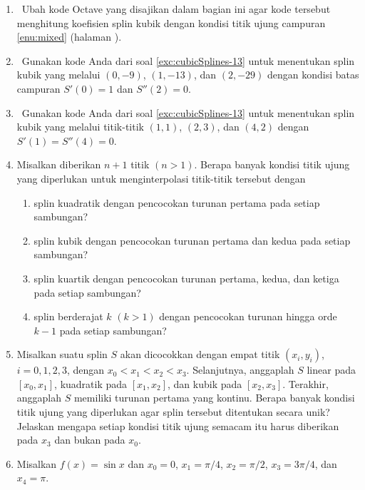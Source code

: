 \begin{enumerate}
\begin{enumerate}
\item \ref{exc:cubicSplines-10}
\item \label{exc:cubicSplines-16}\ref{exc:cubicSplines-11} \hasasolution 
\item \label{exc:cubicSplines-17}\ref{exc:cubicSplines-12} \hasananswer 
\end{enumerate}
\item \octave\ \label{exc:cubicSplines-13}Ubah kode Octave yang disajikan
dalam bagian ini agar kode tersebut menghitung koefisien splin kubik
dengan kondisi titik ujung campuran \ref{enu:mixed} (halaman \pageref{enu:mixed}).
\item \octave\ Gunakan kode Anda dari soal \ref{exc:cubicSplines-13} untuk
menentukan splin kubik yang melalui $(0,-9)$, $(1,-13)$, dan $(2,-29)$
dengan kondisi batas campuran $S'(0)=1$ dan $S''(2)=0$.
\item \octave\ Gunakan kode Anda dari soal \ref{exc:cubicSplines-13} untuk
menentukan splin kubik yang melalui titik-titik $(1,1)$, $(2,3)$,
dan $(4,2)$ dengan $S'(1)=S''(4)=0$.
\item Misalkan diberikan $n+1$ titik $(n>1)$. Berapa banyak kondisi titik
ujung yang diperlukan untuk menginterpolasi titik-titik tersebut dengan

\begin{enumerate}
\item splin kuadratik dengan pencocokan turunan pertama pada setiap sambungan?
\item splin kubik dengan pencocokan turunan pertama dan kedua pada setiap
sambungan?
\item splin kuartik dengan pencocokan turunan pertama, kedua, dan ketiga
pada setiap sambungan?
\item splin berderajat $k$ $(k>1)$ dengan pencocokan turunan hingga orde
$k-1$ pada setiap sambungan?
\end{enumerate}
\item Misalkan suatu splin $S$ akan dicocokkan dengan empat titik $(x_{i},y_{i})$,
$i=0,1,2,3$, dengan $x_{0}<x_{1}<x_{2}<x_{3}$. Selanjutnya, anggaplah
$S$ linear pada $[x_{0},x_{1}]$, kuadratik pada $[x_{1},x_{2}]$,
dan kubik pada $[x_{2},x_{3}]$. Terakhir, anggaplah $S$ memiliki
turunan pertama yang kontinu. Berapa banyak kondisi titik ujung yang
diperlukan agar splin tersebut ditentukan secara unik? Jelaskan mengapa
setiap kondisi titik ujung semacam itu harus diberikan pada $x_{3}$
dan bukan pada $x_{0}$.
\item Misalkan $f(x)=\sin x$ dan $x_{0}=0$, $x_{1}=\pi/4$, $x_{2}=\pi/2$,
$x_{3}=3\pi/4$, dan $x_{4}=\pi$.


\end{enumerate}
